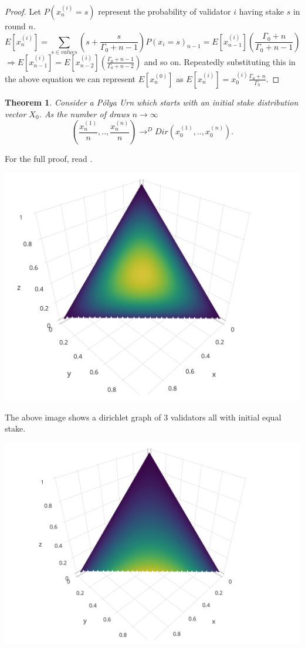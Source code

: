 \documentclass{article}
\newtheorem{theorem}{Theorem}[subsection]
\renewcommand{\|}{\;|\;}
\begin{document}
\begin{proof}

Let $P(x_n^{(i)} = s)$ represent the probability of validator $i$ having stake $s$ in round $n$.
$$E[x_n^{(i)}] = \sum_{s \in values} \left(s + \frac{s}{\Gamma_0+n-1}\right)P(x_i = s)_{n-1} = E[x_{n-1}^{(i)}]\left(\frac{\Gamma_0+n}{\Gamma_0+n-1}\right)$$ 
$\Rightarrow E[x_{n-1}^{(i)}] = E[x_{n-2}^{(i)}] \left(\frac{\Gamma_0+n-1}{\Gamma_0+n-2}\right)$ and so on. Repeatedly substituting this in the above equation we can represent $E[x_{n}^{(0)}]$ as $E[x_n^{(i)}] = x_0^{(i)}\frac{\Gamma_0 + n}{\Gamma_0}$.
\end{proof}
\begin{theorem}
Consider a P\'olya Urn which starts with an initial stake distribution vector $X_0$. As the number of draws $n \rightarrow \infty$
\begin{equation}
    (\frac{x_n^{(1)}}{n},..,\frac{x_n^{(n)}}{n}) \rightarrow^D Dir(x_0^{(1)},..,x_0^{(n)}).
\end{equation}
\end{theorem} 
For the full proof, read \cite{Blackwell1973}.
\begin{center}
 \includegraphics[scale=0.3]{images/dir_2_2_2.png}  
\end{center}
The above image shows a dirichlet graph of 3 validators all with initial equal stake.
\begin{center}
\includegraphics[scale=0.3]{images/dir_2_2_1.png}
\end{center}
\end{document}
